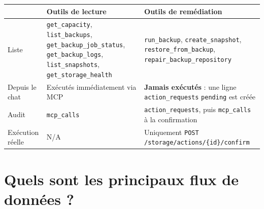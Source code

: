 \documentclass[11pt,a4paper]{report}
\newcommand{\fn}[1]{\texttt{\small\textcolor{oasisviolet}{#1}}}
\newcommand{\tbl}[1]{\texttt{\small\textcolor{oasisamber}{#1}}}
\newcommand{\route}[1]{\texttt{\small\textcolor{oasisgreen}{#1}}}
\begin{document}
\begin{longtable}{@{}p{3.6cm}p{5.4cm}p{5.5cm}@{}}
\toprule
& \textbf{Outils de lecture} & \textbf{Outils de remédiation}\\
\midrule
\endhead
Liste & \fn{get\_capacity}, \fn{list\_backups}, \fn{get\_backup\_job\_status}, \fn{get\_backup\_logs}, \fn{list\_snapshots}, \fn{get\_storage\_health} & \fn{run\_backup}, \fn{create\_snapshot}, \fn{restore\_from\_backup}, \fn{repair\_backup\_repository}\\
Depuis le chat & Exécutés immédiatement via MCP & \textbf{Jamais exécutés} : une ligne \tbl{action\_requests} \texttt{pending} est créée\\
Audit & \tbl{mcp\_calls} & \tbl{action\_requests}, puis \tbl{mcp\_calls} à la confirmation\\
Exécution réelle & N/A & Uniquement \route{POST /storage/actions/\{id\}/confirm}\\
\bottomrule
\end{longtable}

\section{Quels sont les principaux flux de données ?}
\end{document}
